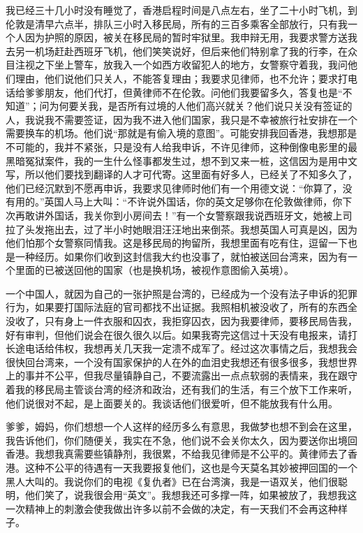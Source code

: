 \par {}
\par 我已经三十几小时没有睡觉了，香港启程时间是八点左右，坐了二十小时飞机，到伦敦是清早六点半，排队三小时入移民局，所有的三百多乘客全部放行，只有我一个人因为护照的原因，被关在移民局的暂时牢狱里。我申辩无用，我要求警方送我去另一机场赶赴西班牙飞机，他们笑笑说好，但后来他们特别拿了我的行李，在众目注视之下坐上警车，放我入一个如西方收留犯人的地方，女警察守着我，我问他们理由，他们说他们只关人，不能答复理由；我要求见律师，也不允许；要求打电话给爹爹朋友，他们代打，但黄律师不在伦敦。问他们我要留多久，答复也是“不知道”；问为何要关我，是否所有过境的人他们高兴就关？他们说只关没有签证的人，我说我不需要签证，因为我不进入他们国家，我只是不幸被旅行社安排在一个需要换车的机场。他们说“那就是有偷入境的意图”。可能安排我回香港，我想那是不可能的，我并不紧张，只是没有人给我申诉，不许见律师，这种倒像电影里的最黑暗冤狱案件，我的一生什么怪事都发生过，想不到又来一桩，这信因为是用中文写，所以他们要找到翻译的人才可代寄。这里面有好多人，已经关了不知多久了，他们已经沉默到不愿再申诉，我要求见律师时他们有一个用德文说：“你算了，没有用的。”英国人马上大叫：“不许说外国话，你的英文足够你在伦敦做律师，你下次再敢讲外国话，我关你到小房间去！”有一个女警察跟我说西班牙文，她被上司拉了头发拖出去，过了半小时她眼泪汪汪地出来倒茶。我想英国人可真是凶，因为他们怕那个女警察同情我。这是移民局的拘留所，我想里面有吃有住，逗留一下也是一种经历。如果你们收到这封信我大约也没事了，就怕被送回台湾来，因为有一个里面的已被送回他的国家（也是换机场，被视作意图偷入英境）。
\par 一个中国人，就因为自己的一张护照是台湾的，已经成为一个没有法子申诉的犯罪行为，如果要打国际法庭的官司都找不出证据。我照相机被没收了，所有的东西全没收了，只有身上一件衣服和囚衣，我拒穿囚衣，因为我要律师，要移民局告我，好有审判，但他们说会在很久很久以后。如果我寄完这信过十天没有电报来，请打长途电话给伟权，我想再关几天我一定溃不成军了。经过这次事情之后，我想我会很快回台湾来，一个没有国家保护的人在外的血泪史我想还有很多很多，我想世界上的事并不公平，但我尽量镇静自己，不要流露出一点点软弱的表情来，我在跟守着我的移民局主管谈台湾的经济和政治，还有我们的生活，有三个放下工作来听，他们说很对不起，是上面要关的。我谈话他们很爱听，但不能放我有什么用。
\par 爹爹，姆妈，你们想想一个人这样的经历多么有意思，我做梦也想不到会在这里，我告诉他们，你们随便关，我实在不急，他们说不会关你太久，因为要送你出境回香港。我想我真需要些镇静剂，我很累，不给我见律师是不公平的。黄律师去了香港。这种不公平的待遇有一天我要报复他们，这也是今天莫名其妙被押回国的一个黑人大叫的。我说你们的电视《复仇者》已在台湾演，我是一语双关，他们很聪明，他们笑了，说我很会用“英文”。我想我还可多撑一阵，如果被放了，我想我这一次精神上的刺激会使我做出许多以前不会做的决定，有一天我们不会再这种样子。
